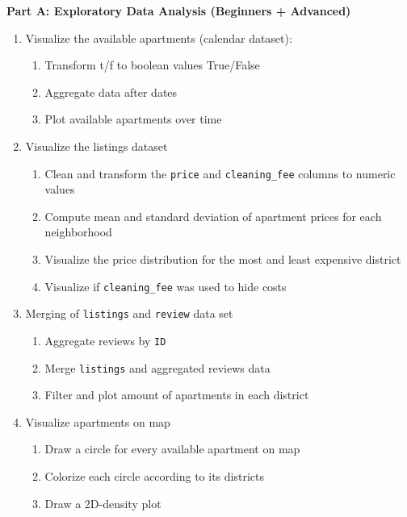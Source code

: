 \documentclass[
  11pt,
]{article}
\begin{document}
\textbf{Part A: Exploratory Data Analysis (Beginners + Advanced)}

\begin{enumerate}
\def\labelenumi{\arabic{enumi}.}
\item
  Visualize the available apartments (calendar dataset):

  \begin{enumerate}
  \def\labelenumii{\alph{enumii}.}
  \item
    Transform t/f to boolean values True/False
  \item
    Aggregate data after dates
  \item
    Plot available apartments over time
  \end{enumerate}
\item
  Visualize the listings dataset

  \begin{enumerate}
  \def\labelenumii{\alph{enumii}.}
  \item
    Clean and transform the \texttt{price} and \texttt{cleaning\_fee} columns to numeric values
  \item
    Compute mean and standard deviation of apartment prices for each neighborhood
  \item
    Visualize the price distribution for the most and least expensive district
  \item
    Visualize if \texttt{cleaning\_fee} was used to hide costs
  \end{enumerate}
\item
  Merging of \texttt{listings} and \texttt{review} data set

  \begin{enumerate}
  \def\labelenumii{\alph{enumii}.}
  \item
    Aggregate reviews by \texttt{ID}
  \item
    Merge \texttt{listings} and aggregated reviews data
  \item
    Filter and plot amount of apartments in each district
  \end{enumerate}
\item
  Visualize apartments on map

  \begin{enumerate}
  \def\labelenumii{\alph{enumii}.}
  \item
    Draw a circle for every available apartment on map
  \item
    Colorize each circle according to its districts
  \item
    Draw a 2D-density plot
  \end{enumerate}
\end{enumerate}
\end{document}
